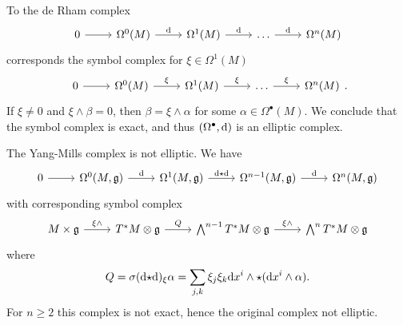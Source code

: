 \begin{example}
  To the de Rham complex
  \begin{equation*}
    \begin{tikzcd}
      0 \arrow[r] &
      \Omega^0 (M) \arrow[r, "\drm"] &
      \Omega^1 (M) \arrow[r, "\drm"] &
      \dots \arrow[r, "\drm"] &
      \Omega^n (M)
    \end{tikzcd}
  \end{equation*}
  corresponds the symbol complex for $\xi \in \Omega^1 (M)$
  \begin{equation*}
    \begin{tikzcd}
      0 \arrow[r] &
      \Omega^0 (M) \arrow[r, "\xi"] &
      \Omega^1 (M) \arrow[r, "\xi"] &
      \dots \arrow[r, "\xi"] &
      \Omega^n (M)
    \end{tikzcd}.
  \end{equation*}
  If $\xi \neq 0$ and $\xi \wedge \beta = 0$, then $\beta = \xi \wedge \alpha$ for some $\alpha \in \Omega^\bullet(M)$. We conclude that the symbol complex is exact, and thus $(\Omega^\bullet, \mathrm{d})$ is an elliptic complex.
\end{example}

\begin{example}
  The Yang-Mills complex is not elliptic. We have
  \begin{equation*}
    \begin{tikzcd}
      0 \arrow[r] &
      \Omega^0(M, \gfrak) \arrow[r, "\drm"] &
      \Omega^1(M, \gfrak) \arrow[r, "\drm \hodge \drm"] &
      \Omega^{n-1}(M, \gfrak) \arrow[r, "\drm"] &
      \Omega^n (M, \gfrak)
    \end{tikzcd}
  \end{equation*}
  with corresponding symbol complex
  \begin{equation*}
    \begin{tikzcd}
      M \times \gfrak \arrow[r, "\xi \wedge"] &
      T^* M \otimes \gfrak \arrow[r, "Q"] &
      \bigwedge^{n-1} T^* M \otimes \gfrak \arrow[r, "\xi \wedge"] &
      \bigwedge^n T^* M \otimes \gfrak
    \end{tikzcd}
  \end{equation*}
  where
  \begin{equation*}
    Q = \sigma(\mathrm{d} {\star} \mathrm{d})_\xi \alpha \\
      = \sum_{j, k} \xi_j \xi_k \mathrm{d} x^i \wedge
      {\star} (\mathrm{d} x^i \wedge \alpha).
  \end{equation*}
  For $n \geq 2$ this complex is not exact, hence the original complex not elliptic.
\end{example}
